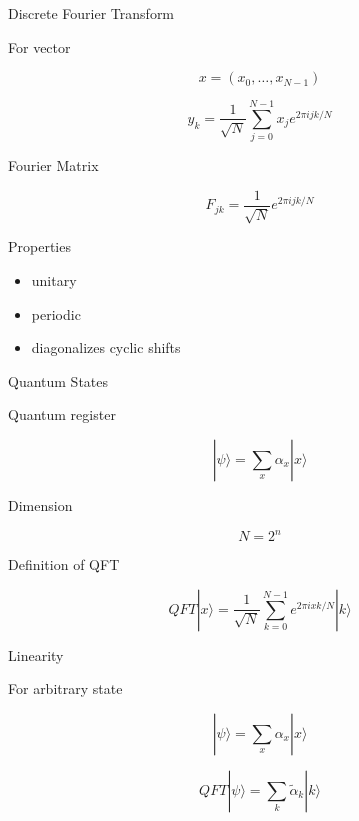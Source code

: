 \documentclass{beamer}
\begin{document}

\begin{frame}{Discrete Fourier Transform}

For vector

\[
x=(x_0,\dots,x_{N-1})
\]

\[
y_k =
\frac{1}{\sqrt N}
\sum_{j=0}^{N-1}
x_j e^{2\pi i jk/N}
\]

\end{frame}


\begin{frame}{Fourier Matrix}

\[
F_{jk}=
\frac{1}{\sqrt N}
e^{2\pi i jk/N}
\]

Properties

\begin{itemize}
\item unitary
\item periodic
\item diagonalizes cyclic shifts
\end{itemize}

\end{frame}


\begin{frame}{Quantum States}

Quantum register

\[
|\psi\rangle =
\sum_x \alpha_x |x\rangle
\]

Dimension

\[
N=2^n
\]

\end{frame}


\begin{frame}{Definition of QFT}

\[
QFT|x\rangle =
\frac{1}{\sqrt N}
\sum_{k=0}^{N-1}
e^{2\pi i xk/N}|k\rangle
\]

\end{frame}


\begin{frame}{Linearity}

For arbitrary state

\[
|\psi\rangle =
\sum_x \alpha_x |x\rangle
\]

\[
QFT|\psi\rangle =
\sum_k \tilde{\alpha}_k |k\rangle
\]

\end{frame}
\end{document}
